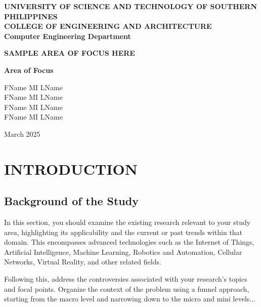 \documentclass[12pt]{report}
\begin{document}
	
	\begin{center}
		\textbf{UNIVERSITY OF SCIENCE AND TECHNOLOGY OF SOUTHERN PHILIPPINES} \\
		\textbf{COLLEGE OF ENGINEERING AND ARCHITECTURE} \\
		\textbf{Computer Engineering Department}
	\end{center}
	
	\vspace{2cm}
	
	\begin{center}
		\textbf{SAMPLE AREA OF FOCUS HERE}
	\end{center}
	
	\vspace{1cm}
	
	\begin{center}
		\textbf{Area of Focus}
	\end{center}
	
	\vspace{1cm}
	
	\begin{center}
		FName MI LName \\
		FName MI LName \\
		FName MI LName \\
		FName MI LName \\
	\end{center}
	
	\vspace{1cm}
	
	\begin{center}
		March 2025
	\end{center}
	
	\chapter{INTRODUCTION}
	
	\section{Background of the Study}
	In this section, you should examine the existing research relevant to your study area, highlighting its applicability and the current or past trends within that domain. This encompasses advanced technologies such as the Internet of Things, Artificial Intelligence, Machine Learning, Robotics and Automation, Cellular Networks, Virtual Reality, and other related fields.
	
	Following this, address the controversies associated with your research's topics and focal points. Organize the context of the problem using a funnel approach, starting from the macro level and narrowing down to the micro and mini levels...
	
\end{document}
